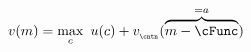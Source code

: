  \begin{equation}\begin{gathered}\begin{aligned}
        \vFunc(\mNrm) & = \max_{\cNrm}~ \uFunc(\cNrm) + \vFunc_{_\cntn}(\overbrace{\mNrm-\cFunc}^{=\aNrm}) \label{eq:vMidStgCNrm}
      \end{aligned}\end{gathered}\end{equation}
